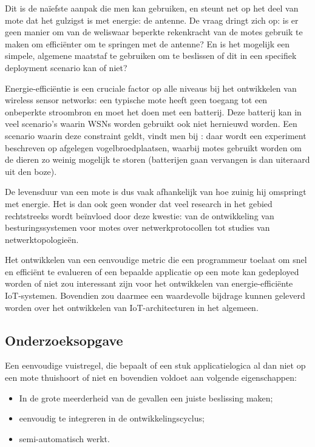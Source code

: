 \documentclass[11pt]{article}
\begin{document}
Dit is de na\"iefste aanpak die men kan gebruiken, en steunt net op het deel van
mote dat het gulzigst is met energie: de antenne.  De vraag dringt zich op: is
er geen manier om van de weliswaar beperkte rekenkracht van de motes gebruik te
maken om effici\"enter om te springen met de antenne? En is het mogelijk een
simpele, algemene maatstaf te gebruiken om te beslissen of dit in een specifiek
deployment scenario kan of niet?

Energie-effici\"entie is een cruciale factor op alle niveaus bij het ontwikkelen
van wireless sensor networks: een typische mote heeft geen toegang tot een
onbeperkte stroombron en moet het doen met een batterij. Deze batterij kan in
veel scenario's waarin WSNs worden gebruikt ook niet hernieuwd worden. Een
scenario waarin deze constraint geldt, vindt men bij
\cite{mainwaring2002wireless}: daar wordt een experiment beschreven op afgelegen
vogelbroedplaatsen, waarbij motes gebruikt worden om de dieren zo weinig
mogelijk te storen (batterijen gaan vervangen is dan uiteraard uit den boze).

De levensduur van een mote is dus vaak afhankelijk van hoe zuinig hij
omspringt met energie. Het is dan ook geen wonder dat veel research in het
gebied rechtstreeks wordt be\"invloed door deze kwestie: van de ontwikkeling van
besturingssystemen voor motes over netwerkprotocollen tot studies van
netwerktopologie\"en.

Het ontwikkelen van een eenvoudige metric die een programmeur toelaat om snel en
effici\"ent te evalueren of een bepaalde applicatie op een mote kan gedeployed
worden of niet zou interessant zijn voor het ontwikkelen van
energie-effici\"ente IoT-systemen. Bovendien zou daarmee een waardevolle
bijdrage kunnen geleverd worden over het ontwikkelen van IoT-architecturen in
het algemeen.

\subsection{Onderzoeksopgave}

Een eenvoudige vuistregel, die bepaalt of een stuk applicatielogica al dan niet op een mote thuishoort of niet en bovendien voldoet aan volgende eigenschappen:
\begin{itemize}
\item In de grote meerderheid van de gevallen een juiste beslissing maken;
\item eenvoudig te integreren in de ontwikkelingscyclus;
\item semi-automatisch werkt.
\end{itemize}
\end{document}
